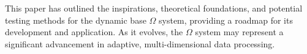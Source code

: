 \documentclass{article}
\begin{document}
This paper has outlined the inspirations, theoretical foundations, and potential testing methods for the dynamic base $\Omega$ system, providing a roadmap for its development and application. As it evolves, the $\Omega$ system may represent a significant advancement in adaptive, multi-dimensional data processing.
\end{document}

